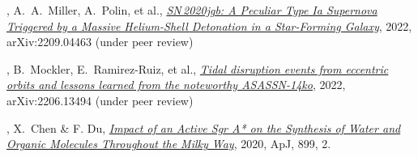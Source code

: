 


\begin{cvpubs}


\cvpub
{ %
\begin{cvitems}
\item {{\bf \color{darktext}{C.~Liu}}, A.~A.~Miller, A.~Polin, et al., \href{https://arxiv.org/abs/2209.04463}{\textit{SN\,2020jgb: A Peculiar Type Ia Supernova Triggered by a Massive Helium-Shell Detonation in a Star-Forming Galaxy}}, 2022, arXiv:2209.04463 (under peer review)}
\item {{\bf \color{darktext}{C.~Liu}}, B.~Mockler, E.~Ramirez-Ruiz, et al., \href{https://arxiv.org/abs/2206.13494}{\textit{Tidal disruption events from eccentric orbits and lessons learned from the noteworthy ASASSN-14ko}}, 2022, arXiv:2206.13494 (under peer review)}
\item {{\bf \color{darktext}{C.~Liu}}, X.~Chen \& F. Du, \href{https://iopscience.iop.org/article/10.3847/1538-4357/aba758}{\textit{Impact of an Active Sgr A* on the Synthesis of Water and Organic Molecules Throughout the Milky Way}}, 2020, ApJ, 899, 2.}
\end{cvitems}
}


\end{cvpubs}